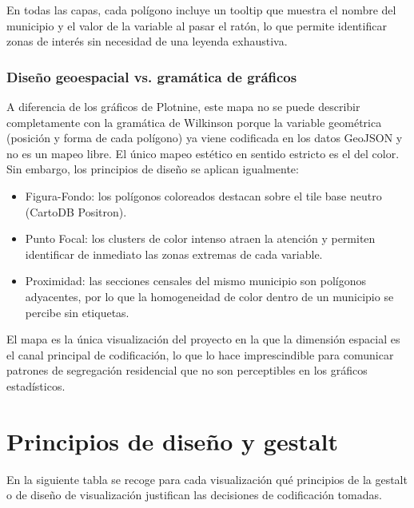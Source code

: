 \documentclass[spanish,a4paper,12pt,oneside]{extreport}
\begin{document}
En todas las capas, cada polígono incluye un tooltip que muestra el nombre del municipio y el valor de la variable al pasar el ratón, lo que permite identificar zonas de interés sin necesidad de una leyenda exhaustiva.

\subsection{Diseño geoespacial vs. gramática de gráficos}

A diferencia de los gráficos de Plotnine, este mapa no se puede describir completamente con la gramática de Wilkinson porque la variable geométrica (posición y forma de cada polígono) ya viene codificada en los datos GeoJSON y no es un mapeo libre. El único mapeo estético en sentido estricto es el del color. Sin embargo, los principios de diseño se aplican igualmente:

\begin{itemize}
  \item Figura-Fondo: los polígonos coloreados destacan sobre el tile base neutro (CartoDB Positron).
  \item Punto Focal: los clusters de color intenso atraen la atención y permiten identificar de inmediato las zonas extremas de cada variable.
  \item Proximidad: las secciones censales del mismo municipio son polígonos adyacentes, por lo que la homogeneidad de color dentro de un municipio se percibe sin etiquetas.
\end{itemize}

El mapa es la única visualización del proyecto en la que la dimensión espacial es el canal principal de codificación, lo que lo hace imprescindible para comunicar patrones de segregación residencial que no son perceptibles en los gráficos estadísticos.


\chapter{Principios de diseño y gestalt}

En la siguiente tabla se recoge para cada visualización qué principios de la gestalt o de diseño de visualización justifican las decisiones de codificación tomadas.
\end{document}
